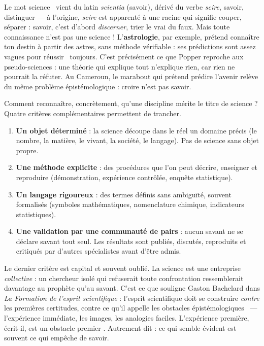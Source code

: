 \documentclass[11pt]{article}
\newcounter{popsec}
\newcounter{popsub}
\newcommand{\courssub}[1]{%
  \stepcounter{popsub}%
  \par\vspace{9pt}\noindent{\popxbold\fontsize{11.5}{13}\selectfont\color{popink}{\color{poporange}\thepopsec.\thepopsub}\hspace{6pt}#1}\par\nopagebreak\vspace{4pt}
}
\begin{document}
\begin{savaistu}
Le mot \guillemotleft science \guillemotright\ vient du latin \emph{scientia} (savoir), dérivé du verbe \emph{scire}, \guillemotleft savoir, distinguer \guillemotright — à l'origine, \emph{scire} est apparenté à une racine qui signifie \guillemotleft couper, séparer \guillemotright : savoir, c'est d'abord \emph{discerner}, trier le vrai du faux. Mais toute connaissance n'est pas une science ! L'\textbf{astrologie}, par exemple, prétend connaître ton destin à partir des astres, sans méthode vérifiable : ses prédictions sont assez vagues pour \guillemotleft réussir \guillemotright\ toujours. C'est précisément ce que Popper reproche aux pseudo-sciences : une théorie qui explique tout n'explique rien, car rien ne pourrait la réfuter. Au Cameroun, le marabout qui prétend prédire l'avenir relève du même problème épistémologique : croire n'est pas savoir.
\end{savaistu}

\courssub{Les critères de scientificité}

Comment reconnaître, concrètement, qu'une discipline mérite le titre de science ? Quatre critères complémentaires permettent de trancher.

\begin{aretenir}
\begin{enumerate}
\item \textbf{Un objet déterminé} : la science découpe dans le réel un domaine précis (le nombre, la matière, le vivant, la société, le langage). Pas de science sans objet propre.
\item \textbf{Une méthode explicite} : des procédures que l'on peut décrire, enseigner et reproduire (démonstration, expérience contrôlée, enquête statistique).
\item \textbf{Un langage rigoureux} : des termes définis sans ambiguïté, souvent formalisés (symboles mathématiques, nomenclature chimique, indicateurs statistiques).
\item \textbf{Une validation par une communauté de pairs} : aucun savant ne se déclare savant tout seul. Les résultats sont publiés, discutés, reproduits et critiqués par d'autres spécialistes avant d'être admis.
\end{enumerate}
\end{aretenir}

Le dernier critère est capital et souvent oublié. La science est une entreprise \emph{collective} : un chercheur isolé qui refuserait toute confrontation ressemblerait davantage au prophète qu'au savant. C'est ce que souligne Gaston Bachelard dans \emph{La Formation de l'esprit scientifique} : l'esprit scientifique doit se construire \emph{contre} les premières certitudes, contre ce qu'il appelle les \guillemotleft obstacles épistémologiques \guillemotright\ — l'expérience immédiate, les images, les analogies faciles. \guillemotleft L'expérience première, écrit-il, est un obstacle premier \guillemotright. Autrement dit : ce qui semble évident est souvent ce qui empêche de savoir.
\end{document}
